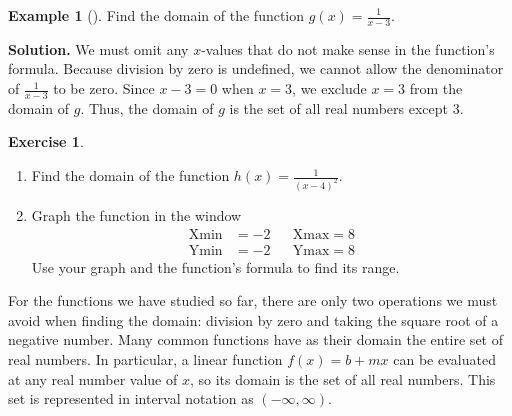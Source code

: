 \documentclass[10pt,]{book}
\theoremstyle{plain}
\theoremstyle{definition}
\theoremstyle{definition}
\theoremstyle{definition}
\newtheorem{example}[theorem]{Example}
\theoremstyle{definition}
\theoremstyle{definition}
\newtheorem{exercise}[theorem]{Exercise}
\numberwithin{equation}{section}
\newcommand{\amp}{ & }
\begin{document}
\begin{example}[]\label{example-domain-reciprocal}
Find the domain of the function \(g(x) = \frac{1}{x−3}\).%
\par\medskip\noindent%
\textbf{Solution.}\quad 
    We must omit any \(x\)-values that do not make sense in the function's formula. Because division by zero is undefined, we cannot allow the denominator of \(\frac{1}{x−3}\) to be zero. Since \(x − 3 = 0\) when \(x = 3\), we exclude \(x = 3\) from the domain of \(g\). Thus, the domain of \(g\) is the set of all real numbers except \(3\).
%
\end{example}
\begin{exercise}\label{exercise-domain-from-formula}
\leavevmode%
\begin{enumerate}[label=*\alph**]
\item\hypertarget{li-385}{}
            Find the domain of the function \(h(x) = \frac{1}{(x − 4)^2}\).
        \item\hypertarget{li-386}{}
            Graph the function in the window
            \begin{align}
            \text{Xmin} \amp = −2 \amp\amp \text{Xmax} = 8\\
            \text{Ymin} \amp = −2 \amp\amp \text{Ymax} = 8
            \end{align}
            Use your graph and the function’s formula to find its range.\end{enumerate}
\end{exercise}

    For the functions we have studied so far, there are only two operations we must avoid when finding the domain: division by zero and taking the square root of a negative number. Many common functions have as their domain the entire set of real numbers. In particular, a linear function \(f (x) = b + mx\) can be evaluated at any real number value of \(x\), so its domain is the set of all real numbers. This set is represented in interval notation as \((−\infty, \infty)\).
%
\par
\end{document}
